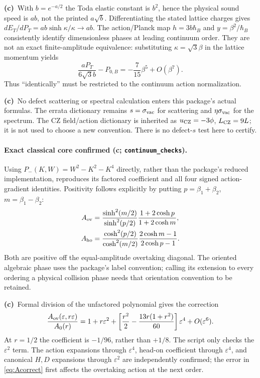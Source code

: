 \documentclass[11pt,a4paper]{article}
\newcommand{\Lc}{\textbf{(c)}\ }
\begin{document}
\Lc With $b=e^{-a/2}$ the Toda elastic constant is $b^2$, hence the physical
sound speed is $ab$, not the printed $a\sqrt b$.
Differentiating the stated lattice charges gives
$dE_T/dP_T=ab\sinh\kappa/\kappa\to ab$.
The action/Planck map $h=3b\hbar_B$ and $y=\beta^2/\hbar_B$ consistently
identify dimensionless phases at leading continuum order. They are not an
exact finite-amplitude equivalence: substituting $\kappa=\sqrt3\beta$ in
the lattice momentum yields
\[
 \frac{aP_T}{6\sqrt3b}-P_{0,B}=-\frac7{15}\beta^5+O(\beta^7).
\]
Thus ``identically'' must be restricted to the continuum action normalization.

\Lc No defect scattering or spectral calculation enters this package's
actual formulas. The errata dictionary remains $s=\sigma_{\rm vac}$ for
scattering and $\eta\sigma_{\rm vac}$ for the spectrum. The CZ field/action
dictionary is inherited as $u_{\rm CZ}=-3\phi$, $L_{\rm CZ}=9L$; it is not
used to choose a new convention. There is no defect-$s$ test here to certify.

\paragraph{Exact classical core confirmed (c; \texttt{continuum\_checks}).}
Using $P_-(K,W)=W^2-K^2-K^4$ directly, rather than the package's reduced
implementation, reproduces its factored coefficient and all four signed
action-gradient identities. Positivity follows explicitly by putting
$p=\beta_1+\beta_2$, $m=\beta_1-\beta_2$:
\begin{align*}
 A_{\rm ov}&=\frac{\sinh^2(m/2)}{\sinh^2(p/2)}
             \frac{1+2\cosh p}{1+2\cosh m},\\
 A_{\rm ho}&=\frac{\cosh^2(p/2)}{\cosh^2(m/2)}
             \frac{2\cosh m-1}{2\cosh p-1}.
\end{align*}
Both are positive off the equal-amplitude overtaking diagonal.
The oriented algebraic phase uses the package's label convention; calling
its extension to every ordering a physical collision phase needs that
orientation convention to be retained.

\Lc Formal division of the unfactored polynomial gives the correction
\begin{equation}
 \frac{A_{\rm ov}(\varepsilon,r\varepsilon)}{A_0(r)}
 =1+r\varepsilon^2+
 \left[\frac{r^2}{2}-\frac{13r(1+r^2)}{60}\right]\varepsilon^4
 +O(\varepsilon^6).
 \label{eq:Acorrect}
\end{equation}
At $r=1/2$ the coefficient is $-1/96$, rather than $+1/8$.
The script only checks the $\varepsilon^2$ term. The action expansions through
$\varepsilon^4$, head-on coefficient through $\varepsilon^4$, and canonical
$H,D$ expansions through $\varepsilon^2$ are independently confirmed;
the error in \eqref{eq:Acorrect} first affects the overtaking action at the
next order.
\end{document}
